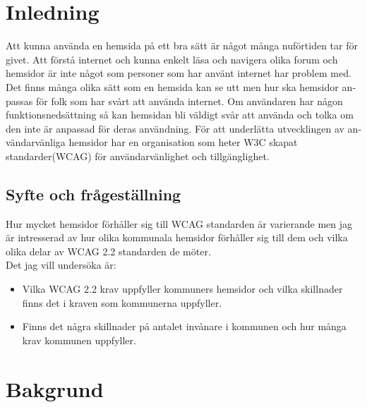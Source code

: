 \documentclass[11p]{article}
\begin{document}
    \begin{otherlanguage}{swedish}
    \newpage
    \tableofcontents
    \newpage

    \section{Inledning}
    Att kunna använda en hemsida på ett bra sätt är något många nuförtiden tar för givet.
    Att förstå internet och kunna enkelt läsa och navigera olika forum och hemsidor är inte något som personer som har använt internet har problem med.
    Det finns många olika sätt som en hemsida kan se utt men hur ska hemsidor anpassas för folk som har svårt att använda internet.
    Om användaren har någon funktionsnedsättning så kan hemsidan bli väldigt svår att använda och tolka om den inte är anpassad för deras användning.
    För att underlätta utvecklingen av användarvänliga hemsidor har en organisation som heter W3C skapat standarder(WCAG) för användarvänlighet och tillgänglighet.

    
    \subsection{Syfte och frågeställning}
    Hur mycket hemsidor förhåller sig till WCAG standarden är varierande men jag är intresserad av hur olika kommunala hemsidor förhåller sig till dem och vilka olika delar av WCAG 2.2 standarden de möter.
    \\Det jag vill undersöka är:
    \begin{itemize}
        \item Vilka WCAG 2.2 krav uppfyller kommuners hemsidor och vilka skillnader finns det i kraven som kommunerna uppfyller.
        \item Finns det några skillnader på antalet invånare i kommunen och hur många krav kommunen uppfyller.
    \end{itemize}

    \section{Bakgrund}


\end{otherlanguage}
\end{document}
